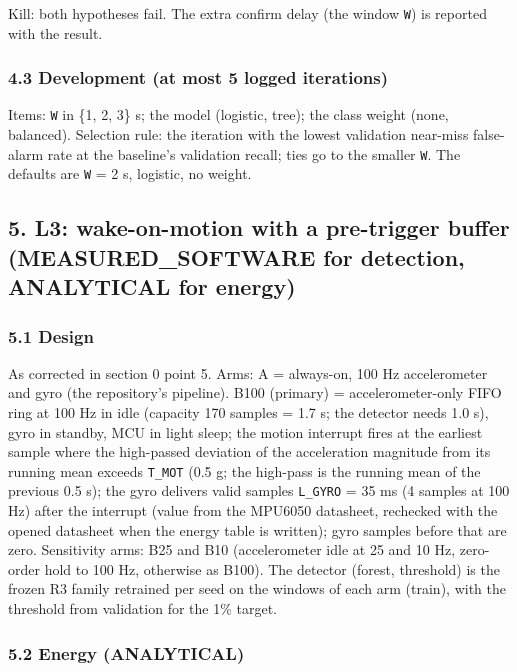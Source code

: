Kill: both hypotheses fail. The extra confirm delay (the window \texttt{W}) is reported with the result.

\subsubsection*{4.3 Development (at most 5 logged iterations)}

Items: \texttt{W} in \{1, 2, 3\} s; the model (logistic, tree); the class weight (none, balanced). Selection rule: the iteration with the lowest validation near-miss false-alarm rate at the baseline's validation recall; ties go to the smaller \texttt{W}. The defaults are \texttt{W} = 2 s, logistic, no weight.

\subsection*{5. L3: wake-on-motion with a pre-trigger buffer (MEASURED\_SOFTWARE for detection, ANALYTICAL for energy)}

\subsubsection*{5.1 Design}

As corrected in section 0 point 5. Arms: A = always-on, 100 Hz accelerometer and gyro (the repository's pipeline). B100 (primary) = accelerometer-only FIFO ring at 100 Hz in idle (capacity 170 samples = 1.7 s; the detector needs 1.0 s), gyro in standby, MCU in light sleep; the motion interrupt fires at the earliest sample where the high-passed deviation of the acceleration magnitude from its running mean exceeds \texttt{T\_MOT} (0.5 g; the high-pass is the running mean of the previous 0.5 s); the gyro delivers valid samples \texttt{L\_GYRO} = 35 ms (4 samples at 100 Hz) after the interrupt (value from the MPU6050 datasheet, rechecked with the opened datasheet when the energy table is written); gyro samples before that are zero. Sensitivity arms: B25 and B10 (accelerometer idle at 25 and 10 Hz, zero-order hold to 100 Hz, otherwise as B100). The detector (forest, threshold) is the frozen R3 family retrained per seed on the windows of each arm (train), with the threshold from validation for the 1\% target.

\subsubsection*{5.2 Energy (ANALYTICAL)}

